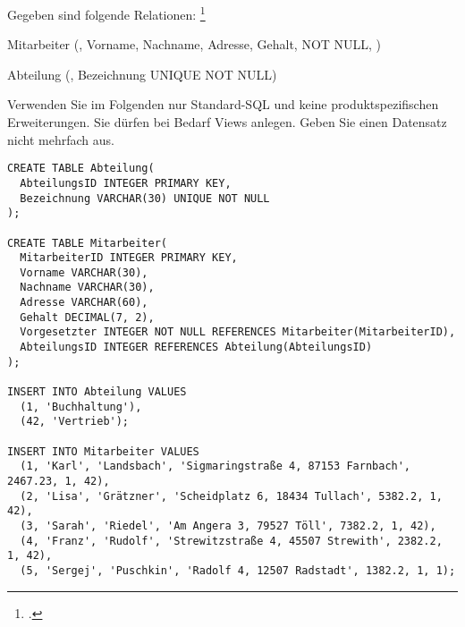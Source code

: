 \documentclass{bschlangaul-aufgabe}
\begin{document}

Gegeben sind folgende Relationen:
\footcite{examen:66116:2021:03}

\begin{liRmodell}
Mitarbeiter (, Vorname, Nachname, Adresse,
Gehalt,  NOT NULL, )

\bigskip

Abteilung (, Bezeichnung UNIQUE NOT NULL)
\end{liRmodell}

Verwenden Sie im Folgenden nur Standard-SQL und keine
produktspezifischen Erweiterungen. Sie dürfen bei Bedarf Views anlegen.
Geben Sie einen Datensatz nicht mehrfach aus.

\begin{verbatim}
CREATE TABLE Abteilung(
  AbteilungsID INTEGER PRIMARY KEY,
  Bezeichnung VARCHAR(30) UNIQUE NOT NULL
);

CREATE TABLE Mitarbeiter(
  MitarbeiterID INTEGER PRIMARY KEY,
  Vorname VARCHAR(30),
  Nachname VARCHAR(30),
  Adresse VARCHAR(60),
  Gehalt DECIMAL(7, 2),
  Vorgesetzter INTEGER NOT NULL REFERENCES Mitarbeiter(MitarbeiterID),
  AbteilungsID INTEGER REFERENCES Abteilung(AbteilungsID)
);

INSERT INTO Abteilung VALUES
  (1, 'Buchhaltung'),
  (42, 'Vertrieb');

INSERT INTO Mitarbeiter VALUES
  (1, 'Karl', 'Landsbach', 'Sigmaringstraße 4, 87153 Farnbach', 2467.23, 1, 42),
  (2, 'Lisa', 'Grätzner', 'Scheidplatz 6, 18434 Tullach', 5382.2, 1, 42),
  (3, 'Sarah', 'Riedel', 'Am Angera 3, 79527 Töll', 7382.2, 1, 42),
  (4, 'Franz', 'Rudolf', 'Strewitzstraße 4, 45507 Strewith', 2382.2, 1, 42),
  (5, 'Sergej', 'Puschkin', 'Radolf 4, 12507 Radstadt', 1382.2, 1, 1);

\end{verbatim}
\end{document}
